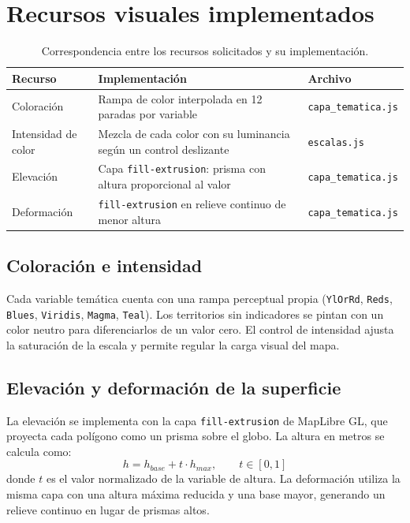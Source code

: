 \documentclass[11pt]{article}
\begin{document}
\section{Recursos visuales implementados}
\begin{table}[H]
\centering
\caption{Correspondencia entre los recursos solicitados y su implementación.}
\begin{tabular}{@{}p{3.2cm}p{6.2cm}p{4.2cm}@{}}
\toprule
\textbf{Recurso} & \textbf{Implementación} & \textbf{Archivo} \\
\midrule
Coloración & Rampa de color interpolada en 12 paradas por variable &
\texttt{capa\_tematica.js} \\
Intensidad de color & Mezcla de cada color con su luminancia según un
control deslizante & \texttt{escalas.js} \\
Elevación & Capa \texttt{fill-extrusion}: prisma con altura proporcional al
valor & \texttt{capa\_tematica.js} \\
Deformación & \texttt{fill-extrusion} en relieve continuo de menor altura &
\texttt{capa\_tematica.js} \\
\bottomrule
\end{tabular}
\end{table}

\subsection{Coloración e intensidad}
Cada variable temática cuenta con una rampa perceptual propia
(\texttt{YlOrRd}, \texttt{Reds}, \texttt{Blues}, \texttt{Viridis},
\texttt{Magma}, \texttt{Teal}). Los territorios sin indicadores se pintan
con un color neutro para diferenciarlos de un valor cero. El control de
intensidad ajusta la saturación de la escala y permite regular la carga
visual del mapa.

\subsection{Elevación y deformación de la superficie}
La elevación se implementa con la capa \texttt{fill-extrusion} de MapLibre
GL, que proyecta cada polígono como un prisma sobre el globo. La altura en
metros se calcula como:
\[
h = h_{base} + t \cdot h_{max}, \qquad t \in [0, 1]
\]
donde $t$ es el valor normalizado de la variable de altura. La deformación
utiliza la misma capa con una altura máxima reducida y una base mayor,
generando un relieve continuo en lugar de prismas altos.
\end{document}
